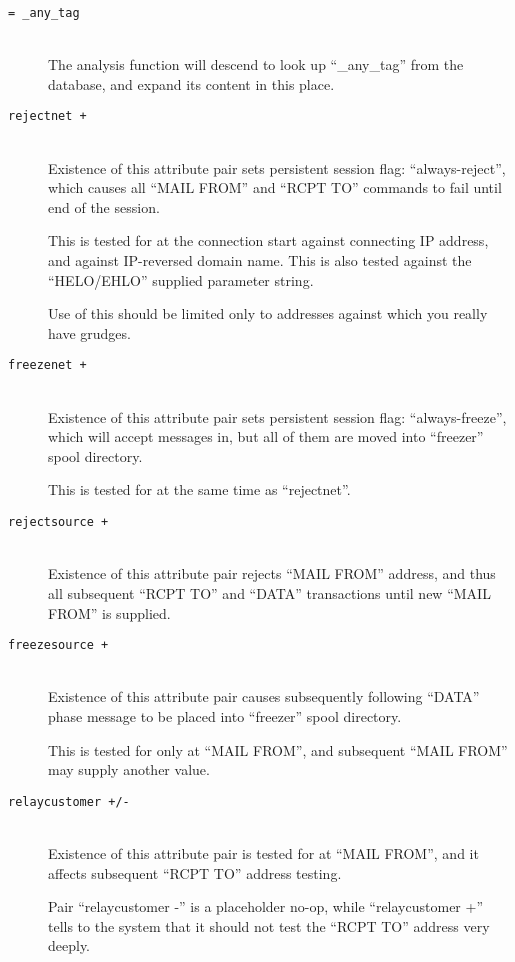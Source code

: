\begin{description}
\item[\tt = \_any\_tag] \mbox{} \\
The analysis function will descend to look up ``\_any\_tag'' from
the database, and expand its content in this place.

\item[\tt rejectnet +] \mbox{} \\
Existence of this attribute pair sets persistent session flag:
``always-reject'', which causes all ``MAIL FROM'' and ``RCPT TO''
commands to fail until end of the session.

This is tested for at the connection start against connecting
IP address, and against IP-reversed domain name.
This is also tested against the ``HELO/EHLO'' supplied parameter
string.

Use of this should be limited only to addresses against which you
really have grudges.

\item[\tt freezenet +] \mbox{} \\
Existence of this attribute pair sets persistent session flag:
``always-freeze'', which will accept messages in, but all of them
are moved into ``freezer'' spool directory.

This is tested for at the same time as ``rejectnet''.

\item[\tt rejectsource +] \mbox{} \\
Existence of this attribute pair rejects ``MAIL FROM'' address,
and thus all subsequent ``RCPT TO'' and ``DATA'' transactions
until new ``MAIL FROM'' is supplied.

\item[\tt freezesource +] \mbox{} \\
Existence of this attribute pair causes subsequently following
``DATA'' phase message to be placed into ``freezer'' spool directory.

This is tested for only at ``MAIL FROM'', and subsequent ``MAIL FROM''
may supply another value.

\item[\tt relaycustomer +/-] \mbox{} \\
Existence of this attribute pair is tested for at ``MAIL FROM'',
and it affects subsequent ``RCPT TO'' address testing.

Pair ``relaycustomer -'' is a placeholder no-op, while
``relaycustomer +'' tells to the system that it should not
test the ``RCPT TO'' address very deeply.


\end{description}
